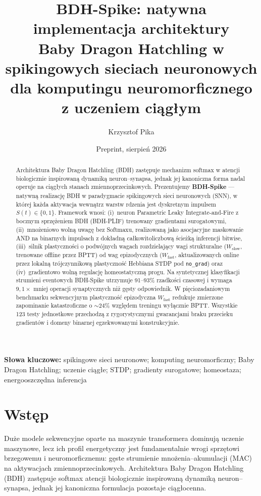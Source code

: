 \documentclass[11pt]{article}
\title{\textbf{BDH-Spike: natywna implementacja architektury\\
Baby Dragon Hatchling w spikingowych sieciach neuronowych\\
dla komputingu neuromorficznego z uczeniem ciągłym}}
\author{Krzysztof Pika}
\date{Preprint, sierpień 2026}
\newcommand{\Wslow}{W_{\text{slow}}}
\newcommand{\Wfast}{W_{\text{fast}}}
\begin{document}
\maketitle

\begin{abstract}
Architektura Baby Dragon Hatchling (BDH) zastępuje mechanizm softmax w
atencji biologicznie inspirowaną dynamiką neuron--synapsa, jednak jej
kanoniczna forma nadal operuje na ciągłych stanach zmiennoprzecinkowych.
Prezentujemy \textbf{BDH-Spike} --- natywną realizację BDH w paradygmacie
spikingowych sieci neuronowych (SNN), w której każda aktywacja wewnątrz
warstw rdzenia jest dyskretnym impulsem $S(t)\in\{0,1\}$. Framework wnosi:
(i)~neuron Parametric Leaky Integrate-and-Fire z bocznym sprzężeniem BDH
(BDH-PLIF) trenowany gradientami surogatowymi, (ii)~mnożeniowo wolną uwagę
bez Softmaxu, realizowaną jako asocjacyjne maskowanie AND na binarnych
impulsach z dokładną całkowitoliczbową ścieżką inferencji bitwise,
(iii)~silnik plastyczności o podwójnych wagach rozdzielający wagi
strukturalne ($\Wslow$, trenowane offline przez BPTT) od wag epizodycznych
($\Wfast$, aktualizowanych online przez lokalną trójczynnikową plastyczność
Hebbiana STDP pod \texttt{no\_grad}) oraz (iv)~gradientowo wolną regulację
homeostatyczną progu. Na syntetycznej klasyfikacji strumieni eventowych
BDH-Spike utrzymuje 91--93\% rzadkości czasowej i wymaga $9{,}1\times$
mniej operacji synaptycznych niż gęsty odpowiednik. W pięciozadaniowym
benchmarku sekwencyjnym plastyczność epizodyczna $\Wfast$ redukuje
zmierzone zapominanie katastroficzne o ${\sim}24\%$ względem treningu
wyłącznie BPTT. Wszystkie 123 testy jednostkowe przechodzą z rygorystycznymi
gwarancjami braku przecieku gradientów i domeny binarnej egzekwowanymi
konstrukcyjnie.
\end{abstract}

\noindent\textbf{Słowa kluczowe:} spikingowe sieci neuronowe; komputing
neuromorficzny; Baby Dragon Hatchling; uczenie ciągłe; STDP; gradienty
surogatowe; homeostaza; energooszczędna inferencja

\section{Wstęp}
Duże modele sekwencyjne oparte na maszynie transformera dominują uczenie
maszynowe, lecz ich profil energetyczny jest fundamentalnie wrogi
sprzętowi brzegowemu i neuromorficznemu: gęste strumienie
mnożenia--akumulacji (MAC) na aktywacjach zmiennoprzecinkowych.
Architektura Baby Dragon Hatchling (BDH) \cite{bdh} zastępuje softmax
atencji biologicznie inspirowaną dynamiką neuron--synapsa, jednak jej
kanoniczna formulacja pozostaje ciągłocenna.
\end{document}

